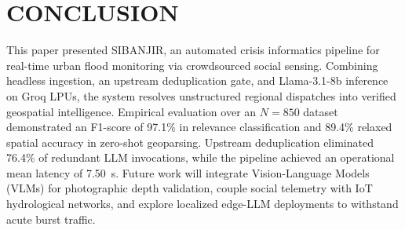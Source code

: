 \documentclass[conference]{IEEEtran}
\begin{document}
\section{CONCLUSION}

This paper presented SIBANJIR, an automated crisis informatics pipeline for real-time urban flood monitoring via crowdsourced social sensing. Combining headless ingestion, an upstream deduplication gate, and Llama-3.1-8b inference on Groq LPUs, the system resolves unstructured regional dispatches into verified geospatial intelligence. Empirical evaluation over an $N=850$ dataset demonstrated an F1-score of 97.1\% in relevance classification and 89.4\% relaxed spatial accuracy in zero-shot geoparsing. Upstream deduplication eliminated 76.4\% of redundant LLM invocations, while the pipeline achieved an operational mean latency of 7.50~s. Future work will integrate Vision-Language Models (VLMs) for photographic depth validation, couple social telemetry with IoT hydrological networks, and explore localized edge-LLM deployments to withstand acute burst traffic.
\end{document}
